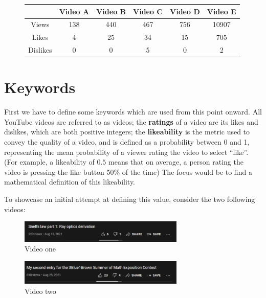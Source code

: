 \documentclass[a4paper,11pt]{article}
\begin{document}
\begin{figure}[H]
    \centering
    \begin{tabular}{c|c|c|c|c|c}
        & Video A & Video B & Video C & Video D & Video E \\
        \hline
        \hline
        Views & 138 & 440 & 467 & 756 & 10907 \\
        \hline
        Likes & 4 & 25 & 34 & 15 & 705 \\
        \hline
        Dislikes & 0 & 0 & 5 & 0 & 2
    \end{tabular}
    \label{tbl:videos}
\end{figure}


\section{Keywords}

First we have to define some keywords which are used from this point onward. All YouTube videos are referred to as videos; the \textbf{ratings} of a video are its likes and dislikes, which are both positive integers; the \textbf{likeability} is the metric used to convey the quality of a video, and is defined as a probability between 0 and 1, representing the mean probability of a viewer rating the video to select ``like''. (For example, a likeability of $0.5$ means that on average, a person rating the video is pressing the like button 50\% of the time) The focus would be to find a mathematical definition of this likeability.

To showcase an initial attempt at defining this value, consider the two following videos:

\begin{figure}[H]
    \centering
    \includegraphics[width=0.7\textwidth]{assets/s_vid2.png}
    \caption{Video one}
    \label{fig:vid1}
\end{figure}

\begin{figure}[H]
    \centering
    \includegraphics[width=0.7\textwidth]{assets/s_vid1.png}
    \caption{Video two}
    \label{fig:vid2}
\end{figure}
\end{document}

